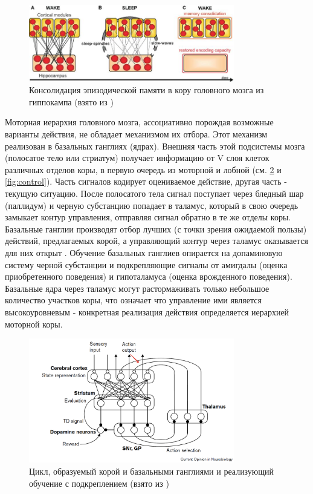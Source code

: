 \documentclass[12pt]{report}
\begin{document}
	\begin{figure}
		\centering
		\includegraphics[width=0.8\textwidth]{misc/phisio/hippocamp_sleep}
		\caption{Консолидация эпизодической памяти в кору головного мозга из гиппокампа (взято из \cite{Saletin2012})}
		\label{fig:hippocamp}		
	\end{figure}	

	
	Моторная иерархия головного мозга, ассоциативно порождая возможные варианты действия, не обладает механизмом их отбора. Этот механизм реализован в базальных ганглиях (ядрах). Внешняя часть этой подсистемы мозга (полосатое тело или стриатум) получает информацию от V слоя клеток различных отделов коры, в первую очередь из моторной и лобной (см. \ref{fig:doy_cortbga} и \ref{fig:control}). Часть сигналов кодирует оцениваемое действие, другая часть - текущую ситуацию. После полосатого тела сигнал поступает через бледный шар (паллидум) и черную субстанцию попадает в таламус, который в свою очередь замыкает контур управления, отправляя сигнал обратно в те же отделы коры. Базальные ганглии производят отбор лучших (с точки зрения ожидаемой пользы) действий, предлагаемых корой, а управляющий контур через таламус оказывается для них открыт \cite{Gurney2001}. Обучение базальных ганглиев опирается на допаминовую систему черной субстанции и подкрепляющие сигналы от амигдалы (оценка приобретенного поведения) и гипоталамуса (оценка врожденного поведения). Базальные ядра через таламус могут растормаживать только небольшое количество участков коры, что означает что управление ими является высокоуровневым - конкретная реализация действия определяется иерархией моторной коры.

	\begin{figure}
		\centering
		\includegraphics[width=0.8\textwidth]{misc/phisio/doya_cortico-bg}
		\caption{Цикл, образуемый корой и базальными ганглиями и реализующий обучение с подкреплением (взято из \cite{Doya2000a})}
		\label{fig:doy_cortbga}		
	\end{figure}
\end{document}
